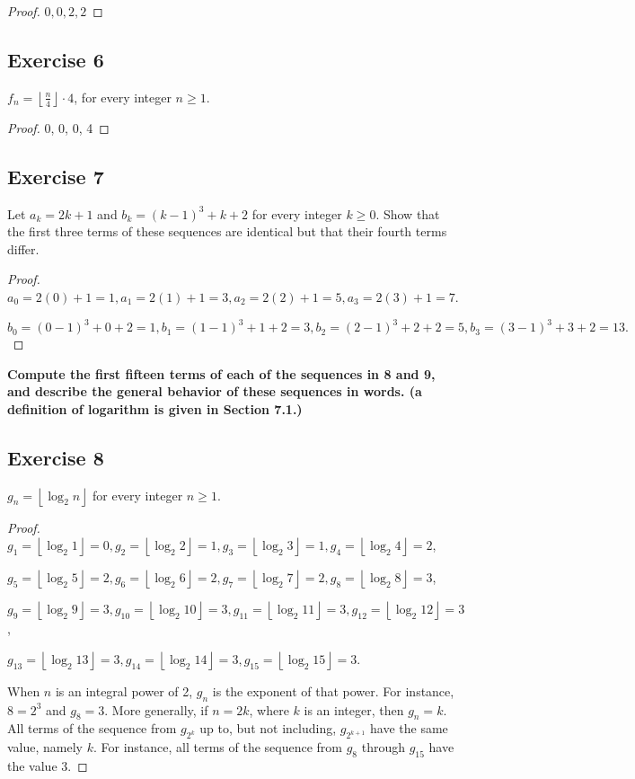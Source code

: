 \documentclass[14pt]{extarticle}
\newcommand{\dps}{\displaystyle}
\newcommand{\floor}[1]{{\left\lfloor#1\right\rfloor}}
\newcommand{\cy}{\color{cyan}}
\begin{document}
\begin{proof}
    $0, 0, 2, 2$
\end{proof}

\subsection{Exercise 6}
$\dps f_n  = \floor{\frac{n}{4}}\cdot 4$, for every integer $n \geq 1$.

\begin{proof}
    0, 0, 0, 4
\end{proof}

\subsection{Exercise 7}
Let $a_k = 2k + 1$ and $b_k = (k - 1)^3 + k + 2$ for every integer $k \geq 0$. Show that the first three terms of these sequences are identical but that their fourth terms differ.

\begin{proof}
    $a_0 = 2(0) + 1 = 1, a_1 = 2(1) + 1 = 3, a_2 = 2(2) + 1 = 5, a_3 = 2(3) + 1 = 7$.

    $b_0 = (0-1)^3 + 0 + 2 = 1, b_1 = (1-1)^3 + 1 + 2 = 3, b_2 = (2-1)^3 + 2 + 2 = 5, b_3 = (3-1)^3 + 3 + 2 = 13.$
\end{proof}

{\bf\cy Compute the first fifteen terms of each of the sequences in 8 and 9, and describe the general behavior of these sequences in words. (a definition of logarithm is given in Section 7.1.)}

\subsection{Exercise 8}
$g_n = \floor{\log_2 n}$ for every integer $n \geq 1$.

\begin{proof}
    $g_1 = \floor{\log_2 1} = 0, g_2 = \floor{\log_2 2} = 1, g_3 = \floor{\log_2 3} = 1, g_4 = \floor{\log_2 4} = 2$,

    $g_5 = \floor{\log_2 5} = 2, g_6 = \floor{\log_2 6} = 2, g_7 = \floor{\log_2 7} = 2, g_8 = \floor{\log_2 8} = 3$,

    $g_9 = \floor{\log_2 9} = 3, g_{10} = \floor{\log_2 10} = 3, g_{11} = \floor{\log_2 11} = 3, g_{12} = \floor{\log_2 12} = 3$,

    $g_{13} = \floor{\log_2 13} = 3, g_{14} = \floor{\log_2 14} = 3, g_{15} = \floor{\log_2 15} = 3$.

    When $n$ is an integral power of 2, $g_n$ is the exponent of that power. For instance, $8 = 2^3$ and $g_8 = 3$. More generally, if $n = 2k$, where $k$ is an integer, then $g_n = k$. All terms of the sequence from $g_{2^k}$ up to, but not including, $g_{2^{k+1}}$ have the same value, namely $k$. For instance, all terms of the sequence from $g_8$ through $g_{15}$ have the value 3.
\end{proof}
\end{document}
